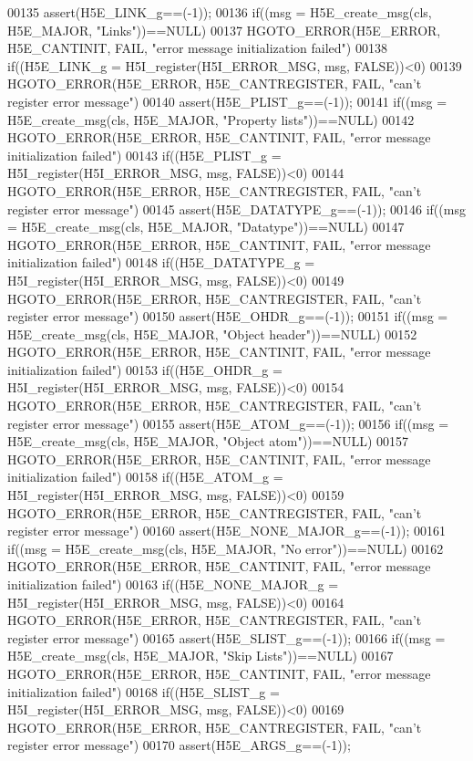 \begin{DoxyCode}
00135 assert(H5E\_LINK\_g==(-1));
00136 if((msg = H5E\_create\_msg(cls, H5E\_MAJOR, "Links"))==NULL)
00137     HGOTO\_ERROR(H5E\_ERROR, H5E\_CANTINIT, FAIL, "error message initialization failed")
00138 if((H5E\_LINK\_g = H5I\_register(H5I\_ERROR\_MSG, msg, FALSE))<0)
00139     HGOTO\_ERROR(H5E\_ERROR, H5E\_CANTREGISTER, FAIL, "can't register error message")
00140 assert(H5E\_PLIST\_g==(-1));
00141 if((msg = H5E\_create\_msg(cls, H5E\_MAJOR, "Property lists"))==NULL)
00142     HGOTO\_ERROR(H5E\_ERROR, H5E\_CANTINIT, FAIL, "error message initialization failed")
00143 if((H5E\_PLIST\_g = H5I\_register(H5I\_ERROR\_MSG, msg, FALSE))<0)
00144     HGOTO\_ERROR(H5E\_ERROR, H5E\_CANTREGISTER, FAIL, "can't register error message")
00145 assert(H5E\_DATATYPE\_g==(-1));
00146 if((msg = H5E\_create\_msg(cls, H5E\_MAJOR, "Datatype"))==NULL)
00147     HGOTO\_ERROR(H5E\_ERROR, H5E\_CANTINIT, FAIL, "error message initialization failed")
00148 if((H5E\_DATATYPE\_g = H5I\_register(H5I\_ERROR\_MSG, msg, FALSE))<0)
00149     HGOTO\_ERROR(H5E\_ERROR, H5E\_CANTREGISTER, FAIL, "can't register error message")
00150 assert(H5E\_OHDR\_g==(-1));
00151 if((msg = H5E\_create\_msg(cls, H5E\_MAJOR, "Object header"))==NULL)
00152     HGOTO\_ERROR(H5E\_ERROR, H5E\_CANTINIT, FAIL, "error message initialization failed")
00153 if((H5E\_OHDR\_g = H5I\_register(H5I\_ERROR\_MSG, msg, FALSE))<0)
00154     HGOTO\_ERROR(H5E\_ERROR, H5E\_CANTREGISTER, FAIL, "can't register error message")
00155 assert(H5E\_ATOM\_g==(-1));
00156 if((msg = H5E\_create\_msg(cls, H5E\_MAJOR, "Object atom"))==NULL)
00157     HGOTO\_ERROR(H5E\_ERROR, H5E\_CANTINIT, FAIL, "error message initialization failed")
00158 if((H5E\_ATOM\_g = H5I\_register(H5I\_ERROR\_MSG, msg, FALSE))<0)
00159     HGOTO\_ERROR(H5E\_ERROR, H5E\_CANTREGISTER, FAIL, "can't register error message")
00160 assert(H5E\_NONE\_MAJOR\_g==(-1));
00161 if((msg = H5E\_create\_msg(cls, H5E\_MAJOR, "No error"))==NULL)
00162     HGOTO\_ERROR(H5E\_ERROR, H5E\_CANTINIT, FAIL, "error message initialization failed")
00163 if((H5E\_NONE\_MAJOR\_g = H5I\_register(H5I\_ERROR\_MSG, msg, FALSE))<0)
00164     HGOTO\_ERROR(H5E\_ERROR, H5E\_CANTREGISTER, FAIL, "can't register error message")
00165 assert(H5E\_SLIST\_g==(-1));
00166 if((msg = H5E\_create\_msg(cls, H5E\_MAJOR, "Skip Lists"))==NULL)
00167     HGOTO\_ERROR(H5E\_ERROR, H5E\_CANTINIT, FAIL, "error message initialization failed")
00168 if((H5E\_SLIST\_g = H5I\_register(H5I\_ERROR\_MSG, msg, FALSE))<0)
00169     HGOTO\_ERROR(H5E\_ERROR, H5E\_CANTREGISTER, FAIL, "can't register error message")
00170 assert(H5E\_ARGS\_g==(-1));

\end{DoxyCode}

